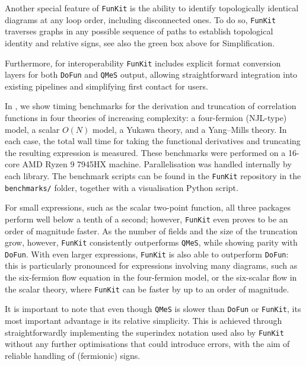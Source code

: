 \documentclass[preprint,10pt,sort&compress]{elsarticle}
\newcommand{\FunKit}{\texttt{FunKit}\xspace}
\newcommand{\QMeS}{\texttt{QMeS}\xspace}
\newcommand{\DoFun}{\texttt{DoFun}\xspace}
\begin{document}
Another special feature of \FunKit is the ability to identify topologically identical diagrams at any loop order, including disconnected ones. To do so, \FunKit traverses graphs in any possible sequence of paths to establish topological identity and relative signs, see also the green box above for Simplification.

Furthermore, for interoperability \FunKit includes explicit format conversion layers for both \DoFun and \QMeS output, allowing straightforward integration into existing pipelines and simplifying first contact for users.

In , we show timing benchmarks for the derivation and truncation of correlation functions in four theories of increasing complexity: 
a four-fermion (NJL-type) model, a scalar $O(N)$ model, a Yukawa theory, and a Yang--Mills theory. In each case, the total wall time for taking the functional derivatives and truncating the resulting expression is measured. These benchmarks were performed on a 16-core AMD Ryzen 9 7945HX machine. Parallelisation was handled internally by each library.
The benchmark scripts can be found in the \FunKit repository in the \texttt{benchmarks/} folder, together with a visualisation Python script.

For small expressions, such as the scalar two-point function, all three packages perform well below a tenth of a second; however, \FunKit even proves to be an order of magnitude faster.
As the number of fields and the size of the truncation grow, however, \FunKit consistently outperforms \QMeS, while showing parity with \DoFun.
With even larger expressions, \FunKit is also able to outperform \DoFun: this is particularly pronounced for expressions involving many diagrams, such as the six-fermion flow equation in the four-fermion model, or the six-scalar flow in the scalar theory, where \FunKit can be faster by up to an order of magnitude.

It is important to note that even though \QMeS is slower than \DoFun or \FunKit, its most important advantage is its relative simplicity. This is achieved through straightforwardly implementing the superindex notation used also by \FunKit without any further optimisations that could introduce errors, with the aim of reliable handling of (fermionic) signs.
\end{document}
